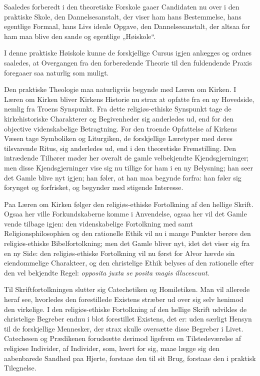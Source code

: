 \documentclass[12pt,a4paper]{book}
\newcommand{\opage}[1]{\marginnote{\footnotesize\textit{[#1]}}}
\begin{document}
Saaledes forberedt i den theoretiske Forskole gaaer Candidaten nu over i den
praktiske Skole, den Dannelsesanstalt, der viser ham hans Bestemmelse, hans
egentlige Formaal, hans Livs ideale Opgave, den Dannelsesanstalt, der altsaa
for ham maa blive den sande og egentlige „Høiskole“.

I denne praktiske Høiskole kunne de forskjellige Cursus igjen anlægges og
ordnes saaledes, at Overgangen fra den forberedende Theorie til den
fuldendende Praxis foregaaer saa naturlig som muligt.

Den praktiske Theologie maa naturligviis begynde med Læren om Kirken. I Læren
om Kirken bliver Kirkens Historie nu strax at opfatte fra en ny Hovedside,
nemlig fra Troens Synspunkt. Fra dette religiøs-ethiske Synspunkt tage de
kirkehistoriske Charakterer og Begivenheder sig anderledes ud, end for den
objective videnskabelige Betragtning. For den troende Opfattelse af Kirkens
Væsen tage Symboliken og Liturgiken, de forskjellige Læretyper med deres
tilsvarende Ritus, sig anderledes ud, end i den theoretiske Fremstilling. Den
intrædende Tilhører møder her overalt de gamle velbekjendte
Kjendsgjerninger; men disse Kjendsgjerninger vise sig nu tillige for ham i en
ny Belysning; han seer det Gamle blive nyt igjen; han føler, at han maa
begynde forfra: han føler sig forynget og forfrisket, og begynder med
stigende Interesse.

\opage{163} Paa Læren om Kirken følger den religiøs-ethiske Fortolkning af den hellige
Skrift. Ogsaa her ville Forkundskaberne komme i Anvendelse, ogsaa her vil det
Gamle vende tilbage igjen: den videnskabelige Fortolkning med samt
Religionsphilosophien og den rationelle Ethik vil nu i mange Punkter berøre
den religiøs-ethiske Bibelfortolkning; men det Gamle bliver nyt, idet det
viser sig fra en ny Side: den religiøs-ethiske Fortolkning vil nu først for
Alvor hævde sin eiendommelige Charakteer, og den christelige Ethik belyses af
den rationelle efter den vel bekjendte Regel: \textit{opposita juxta se
posita magis illucescunt}.

Til Skriftfortolkningen slutter sig Catechetiken og Homiletiken. Man vil
allerede heraf see, hvorledes den forestillede Existens stræber ud over sig
selv henimod den virkelige. I den religiøs-ethiske Fortolkning af den hellige
Skrift udvikles de christelige Begreber endnu i blot forestillet Existens,
det er: uden særligt Hensyn til de forskjellige Mennesker, der strax skulle
oversætte disse Begreber i Livet. Catechesen og Prædikenen forudsætte derimod
ligefrem en Tilstedeværelse af religiøse Individer, af Individer, som, hvert
for sig, maae lægge sig den aabenbarede Sandhed paa Hjerte, forstaae den til
sit Brug, forstaae den i praktisk Tilegnelse.
\end{document}
